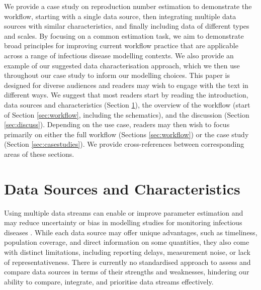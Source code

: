 \documentclass{article}
\begin{document}
We provide a case study on reproduction number estimation to demonstrate the workflow, starting with a single data source, then integrating multiple data sources with similar characteristics, and finally including data of different types and scales.
By focusing on a common estimation task, we aim to demonstrate broad principles for improving current workflow practice that are applicable across a range of infectious disease modelling contexts.
We also provide an example of our suggested data characterisation approach, which we then use throughout our case study to inform our modelling choices.
This paper is designed for diverse audiences and readers may wish to engage with the text in different ways.
We suggest that most readers start by reading the introduction, data sources and characteristics (Section \ref{sec:datareview}), the overview of the workflow (start of Section \ref{sec:workflow}, including the schematics), and the discussion (Section \ref{sec:discuss}).
Depending on the use case, readers may then wish to focus primarily on either the full workflow (Sections \ref{sec:workflow}) or the case study (Section \ref{sec:casestudies}). We provide cross-references between corresponding areas of these sections.

\section{Data Sources and Characteristics} \label{sec:datareview}

Using multiple data streams can enable or improve parameter estimation and may reduce uncertainty or bias in modelling studies for monitoring infectious diseases \citep{deangelis2018analysing, sherratt2021exploring}. While each data source may offer unique advantages, such as timeliness, population coverage, and direct information on some quantities, they also come with distinct limitations, including reporting delays,  measurement noise, or lack of representativeness. There is currently no standardised approach to assess and compare data sources in terms of their strengths and weaknesses, hindering our ability to compare, integrate, and prioritise data streams effectively. 
\end{document}
